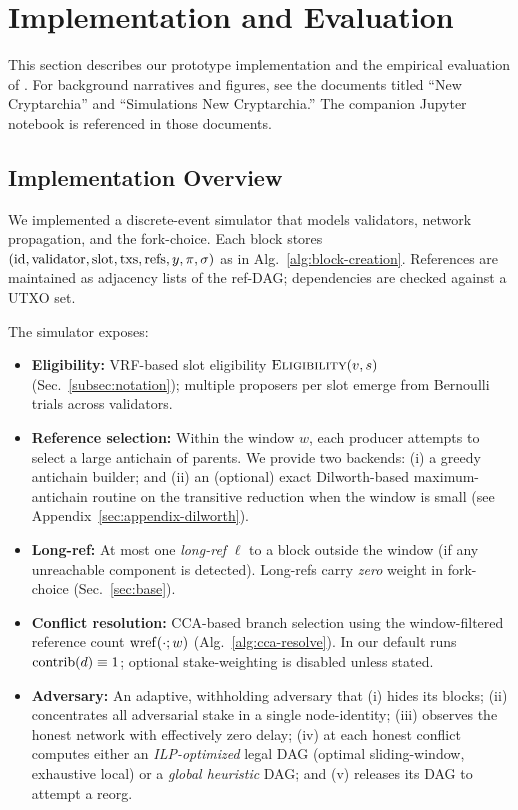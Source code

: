 


\section{Implementation and Evaluation}
\label{sec:impl-eval}

This section describes our prototype implementation and the empirical evaluation of \ProjBase. For background narratives and figures, see the documents titled “New Cryptarchia” and “Simulations New Cryptarchia.” The companion Jupyter notebook is referenced in those documents.

\subsection{Implementation Overview}
We implemented a discrete-event simulator that models validators, network propagation, and the \ProjBase{} fork-choice. Each block stores
$(\mathrm{id},\mathrm{validator},\mathrm{slot},\mathrm{txs},\mathrm{refs},y,\pi,\sigma)$ as in Alg.~\ref{alg:block-creation}. References are maintained as adjacency lists of the ref-DAG; dependencies are checked against a UTXO set.

The simulator exposes:
\begin{itemize}
	\item \textbf{Eligibility:} VRF-based slot eligibility $\textsc{Eligibility}(v,s)$ (Sec.~\ref{subsec:notation}); multiple proposers per slot emerge from Bernoulli trials across validators.
	\item \textbf{Reference selection:} Within the window $w$, each producer attempts to select a large antichain of parents. We provide two backends: (i) a greedy antichain builder; and (ii) an (optional) exact Dilworth-based maximum-antichain routine on the transitive reduction when the window is small (see Appendix~\ref{sec:appendix-dilworth}).
	\item \textbf{Long-ref:} At most one \emph{long-ref} $\ell$ to a block outside the window (if any unreachable component is detected). Long-refs carry \emph{zero} weight in fork-choice (Sec.~\ref{sec:base}).
	\item \textbf{Conflict resolution:} CCA-based branch selection using the window-filtered reference count $\mathrm{wref}(\cdot;w)$ (Alg.~\ref{alg:cca-resolve}). In our default runs $\mathrm{contrib}(d)\equiv 1$; optional stake-weighting is disabled unless stated.
	\item \textbf{Adversary:} An adaptive, withholding adversary that (i) hides its blocks; (ii) concentrates all adversarial stake in a single node-identity; (iii) observes the honest network with effectively zero delay; (iv) at each honest conflict computes either an \emph{ILP-optimized} legal DAG (optimal sliding-window, exhaustive local) or a \emph{global heuristic} DAG; and (v) releases its DAG to attempt a reorg.
\end{itemize}

